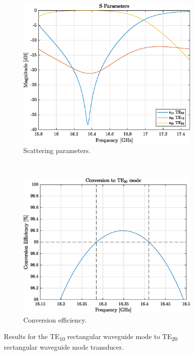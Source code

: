 \documentclass[english,twoside]{article}
\begin{document}
		\begin{figure}[H]
			\centering			
			\begin{subfigure}[b]{0.48\textwidth}
				\includegraphics[width=\textwidth]{figures/wrToWrTE20_irises}
				\caption{Scattering parameters.}
			\end{subfigure}
			~
			\begin{subfigure}[b]{0.48\textwidth}
				\includegraphics[width=\textwidth]{figures/wrToWrTE20_irises_eff}
				\caption{Conversion efficiency.}
			\end{subfigure}
			\caption{Results for the TE\textsubscript{10} rectangular waveguide mode to TE\textsubscript{20} rectangular waveguide mode transducer.}
			\label{fig:wrToWrTE20}
		\end{figure}
	
\end{document}
